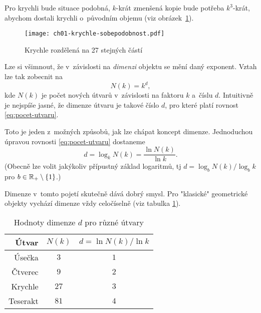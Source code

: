 Pro krychli bude situace podobná, $k$-krát zmenšená kopie bude potřeba $k^3$-krát, abychom dostali krychli o~původním objemu (viz obrázek~\ref{fig:krychle-sobepodobnost}).
\begin{figure}[h]
    \centering
    \texttt{[image: ch01-krychle-sobepodobnost.pdf]}
    \caption{Krychle rozdělená na 27 stejných částí}
    \label{fig:krychle-sobepodobnost}
\end{figure}
Lze si všimnout, že v~závislosti na \emph{dimenzi} objektu se mění daný exponent. Vztah lze tak zobecnit na
\begin{equation}\label{eq:pocet-utvaru}
    N(k)=k^d,
\end{equation}
kde $N(k)$ je počet nových útvarů v~závislosti na faktoru $k$ a~číslu $d$. Intuitivně je nejspíše jasné, že dimenze útvaru je takové číslo $d$, pro které platí rovnost \eqref{eq:pocet-utvaru}.

Toto je jeden z~možných způsobů, jak lze chápat koncept dimenze. Jednoduchou úpravou rovnosti \eqref{eq:pocet-utvaru} dostaneme
\[d=\log_k{N(k)}=\dfrac{\ln{N(k)}}{\ln{k}}.\]
(Obecně lze volit jakýkoliv přípustný základ logaritmů, tj $d=\log_b{N(k)}/\log_b{k}$ pro $b\in\mathbb{R}_+\setminus\left\{1\right\}$.)

Dimenze v~tomto pojetí skutečně dává dobrý smysl. Pro "klasické" geometrické objekty vychází dimenze vždy celočíselně (viz tabulka \ref{table:eukleides-dimenze}).
\begin{table}[h]
    \centering
    \begin{tabular}{r|cc}
    Útvar    & $N(k)$ & $d=\ln{N(k)}/\ln{k}$ \\ \hline
    Úsečka   & $3$      & $1$                          \\
    Čtverec  & $9$      & $2$                          \\
    Krychle  & $27$     & $3$                          \\
    Teserakt & $81$     & $4$                          \\
    \end{tabular}
    \caption{Hodnoty dimenze $d$ pro různé útvary}
    \label{table:eukleides-dimenze}
\end{table}

